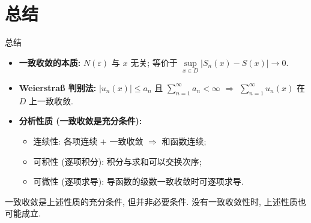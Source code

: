 
\section{总结}


\begin{frame}{总结}

\begin{itemize}
\item[{\larger[2] \color{red} \ding{43}}] \textbf{一致收敛的本质:} $N(\varepsilon)$ 与 $x$ 无关; 等价于 $\sup\limits_{x \in D} |S_n(x) - S(x)| \to 0.$

\pause
\vspace{0.5em}

\item[{\larger[2] \color{red} \ding{43}}] \textbf{Weierstra\ss{} 判别法:} $|u_n(x)| \leqslant a_n$ 且 $\sum\limits_{n=1}^\infty a_n < \infty$ $\Rightarrow$ $\sum\limits_{n=1}^\infty u_n(x)$ 在 $D$ 上一致收敛.

\pause
\vspace{0.5em}

\item[{\larger[2] \color{red} \ding{43}}] \textbf{分析性质 (一致收敛是充分条件):}
\begin{itemize}
\item 连续性: 各项连续 $+$ 一致收敛 $\Rightarrow$ 和函数连续;
\item 可积性 (逐项积分): 积分与求和可以交换次序;
\item 可微性 (逐项求导): 导函数的级数一致收敛时可逐项求导.
\end{itemize}
\end{itemize}

\pause
\vspace{0.5em}

\begin{attnblock}
一致收敛是上述性质的充分条件, 但并\alert{非}必要条件. 没有一致收敛性时, 上述性质也可能成立.
\end{attnblock}

\end{frame}









